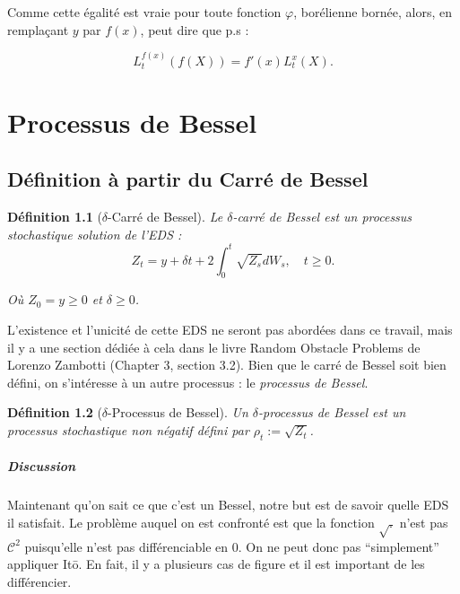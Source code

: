 \documentclass[openany]{book}
\makeatletter
\newcommand{\1}{\mathbbm{1}}
\renewenvironment{proof}[1][\textbf{\textit{Démonstration}}]{%
  \par\pushQED{\qed}%
  \normalfont\topsep6\p@\@plus6\p@\relax
  \trivlist\item[\hskip\labelsep
    #1\@addpunct{.}]\ignorespaces
}{%
  \popQED\endtrivlist\@endpefalse
}
\theoremstyle{thmfont}
\theoremstyle{deffont}
\newtheorem{definition}[definition]{Définition}
\theoremstyle{thmfont}
\theoremstyle{deffont}
\makeatother
\begin{document}
{\begin{proof}
Comme cette égalité est vraie pour toute fonction $\varphi$, borélienne bornée, alors, en remplaçant $y$ par $f(x)$, peut dire que p.s :

$$L_t^{f(x)}(f(X)) =  f'(x) L_t^{x}(X).$$
\end{proof}
}

\chapter{Processus de Bessel}

\section{Définition à partir du Carré de Bessel} 
\begin{definition}[$\delta$-Carré de Bessel] Le \textit{$\delta$-carré de Bessel} est un processus stochastique solution de l'EDS :
  \begin{equation}
    Z_t = y + \delta t + 2 \int_0^t \sqrt{Z_s} dW_s, \quad t\geq0.
    \label{eq:EDSCarreBessel}
  \end{equation}

  Où $Z_0 = y \geq 0$ et $\delta \geq 0$.
\end{definition}

L'existence et l'unicité de cette EDS ne seront pas abordées dans ce travail, mais il y a une section dédiée à cela dans le livre Random Obstacle Problems de Lorenzo Zambotti (Chapter 3, section 3.2).
Bien que le carré de Bessel soit bien défini, on s’intéresse à un autre processus : le \textit{processus de Bessel}.

\begin{definition}[$\delta$-Processus de Bessel] Un $\delta$-\textit{processus de Bessel} est un processus stochastique non négatif défini par $\rho_t := \sqrt{Z_t}$.
\end{definition}

\paragraph{Discussion}
Maintenant qu'on sait ce que c'est un Bessel, notre but est de savoir quelle EDS il satisfait. Le problème auquel on est confronté est que la fonction $\sqrt{.}$ n'est pas $\mathcal C^2$ puisqu'elle n'est pas différenciable en 0. On ne peut donc pas ``simplement'' appliquer Itō. En fait, il y a plusieurs cas de figure et il est important de les différencier.
\end{document}
